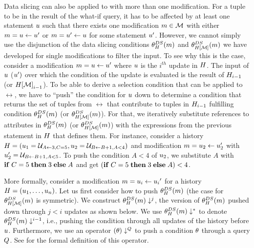 Data slicing can also be applied to \abbrHWs with more than one modification. For a tuple to be in the result of the what-if query, it has to be affected by at least one statement $u$ such that there exists one modification $m \in \mathcal{M}$ with either $m = u \gets u'$ or $m = u' \gets u$ for some statement $u'$. However, we cannot simply use the disjunction of the data slicing conditions $\theta_{H}^{DS}(m)$ and $\theta_{H[\mathcal{M}]}^{DS}(m)$ we have developed for single modifications to filter the input. To see why this is the case, consider a modification $m = u \gets u'$ where $u$ is the $i^{th}$ update in $H$. The
input of $u$ ($u')$ over which the condition of the update is evaluated is the result of $H_{i-1}$ (or ${H[\mathcal{M}]}_{i-1}$). To be able to derive a selection condition that can be applied to $\rel$, we have to ``push'' the condition for $u$ down to determine a condition that returns the set of tuples from $\rel$ that contribute to tuples in $H_{i-1}$ fulfilling condition $\theta_{H}^{DS}(m)$ (or $\theta_{H[\mathcal{M}]}^{DS}(m)$).
For that, we iteratively substitute references to attributes in $\theta_{H}^{DS}(m)$ (or $\theta_{H[\mathcal{M}]}^{DS}(m)$) with the expressions from the previous statement in $H$ that defines them. For instance, consider a history $H = (u_1 = \mathcal{U}_{A \gets 3,C = 5}, u_2 = \mathcal{U}_{B \gets B + 1,A < 4})$ and modification $m = u_2 \gets u_2'$ with $u_2' = \mathcal{U}_{B \gets B + 1,A < 5}$. To push the condition $A < 4$ of $u_2$, we substitute $A$ with $\mathbf{if}\thickspace C=5 \thickspace \mathbf{then} \thickspace 3 \thickspace \mathbf{else} \thickspace A$ and get $(\mathbf{if}\thickspace C=5 \thickspace \mathbf{then} \thickspace 3 \thickspace \mathbf{else} \thickspace A) < 4$.


More formally, consider a modification $m = u_i \gets {u_i}'$ for a history $H = (u_1, \ldots, u_n)$. Let us first consider how to push $\theta_{H}^{DS}(m)$ (the case for $\theta_{H[\mathcal{M}]}^{DS}(m)$ is symmetric).
We construct ${\theta_{H}^{DS}(m)}\downarrow^{j}$, the version of $\theta_{H}^{DS}(m)$ pushed down through $j < i$ updates as shown below. We use ${\theta_{H}^{DS}(m)}\downarrow^{\ast}$ to denote ${\theta_{H}^{DS}(m)}\downarrow^{i-1}$, i.e., pushing the condition through all updates of the history before $u$. Furthermore, we use an operator $(\theta)\downarrow^{Q}$  to push a condition $\theta$ through a query $Q$. See \cite{techreport} for the formal definition of this operator.

